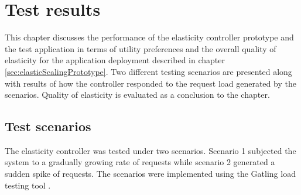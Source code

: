 \documentclass[english]{tktltiki2}
\theoremstyle{definition}
\theoremstyle{remark}
\begin{document}
	\begin{table}[h]
	    \caption{Server applications and tools used in the prototype.}
	    \label{table:componentVersions}
	\end{table}

\section{Test results}
\label{sec:results}

This chapter discusses the performance of the elasticity controller prototype
and the test application in terms of utility preferences and the overall quality
of elasticity for the application deployment described in chapter~
\ref{sec:elasticScalingPrototype}. Two different testing scenarios are
presented along with results of how the controller responded to the request load
generated by the scenarios. Quality of elasticity is evaluated as a conclusion to the chapter.

\subsection{Test scenarios} \label{sec:testScenarios} 

The elasticity controller was tested under two scenarios. Scenario 1 subjected
the system to a gradually growing rate of requests while scenario 2 generated a
sudden spike of requests. The scenarios were implemented using the Gatling load
testing tool \cite{gatling}.
\end{document}
